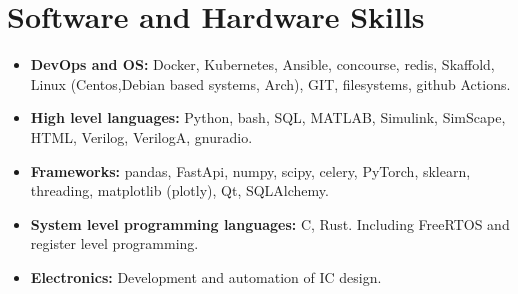 \documentclass{article}
\begin{document}

\section{Software and Hardware Skills}

\begin{itemize}
   \item \textbf{DevOps and OS:} Docker, Kubernetes, Ansible, concourse, redis, Skaffold, Linux (Centos,Debian based systems, Arch), GIT, filesystems, github Actions.
   \item \textbf{High level languages:} Python, bash, SQL, MATLAB, Simulink, SimScape, HTML, Verilog, VerilogA, gnuradio.
   \item \textbf{Frameworks:} pandas, FastApi, numpy, scipy, celery, PyTorch, sklearn, threading, matplotlib (plotly), Qt, SQLAlchemy.
   \item \textbf{System level programming languages:} C, Rust. Including FreeRTOS and register level programming.
   \item \textbf{Electronics:} Development and automation of IC design.

\end{itemize}
\end{document}
